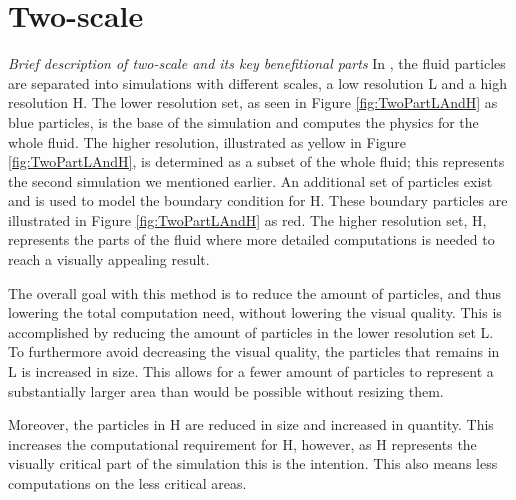 \documentclass[../main.tex]{subfiles}
\begin{document}
\section{Two-scale}
\textit{Brief description of two-scale and its key benefitional parts}
In \cite{solenthaler2011two}, the fluid particles are separated into simulations with different scales, a low resolution L and a high resolution H. The lower resolution set, as seen in Figure \ref{fig:TwoPartLAndH} as blue particles, is the base of the simulation and computes the physics for the whole fluid. The higher resolution, illustrated as yellow in Figure \ref{fig:TwoPartLAndH}, is determined as a subset of the whole fluid; this represents the second simulation we mentioned earlier. An additional set of particles exist and is used to model the boundary condition for H. These boundary particles are illustrated in Figure \ref{fig:TwoPartLAndH} as red. The higher resolution set, H, represents the parts of the fluid where more detailed computations is needed to reach a visually appealing result.

The overall goal with this method is to reduce the amount of particles, and thus lowering the total computation need, without lowering the visual quality. This is accomplished by reducing the amount of particles in the lower resolution set L. To furthermore avoid decreasing the visual quality, the particles that remains in L is increased in size. This allows for a fewer amount of particles to represent a substantially larger area than would be possible without resizing them. 

Moreover, the particles in H are reduced in size and increased in quantity. This increases the computational requirement for H, however, as H represents the visually critical part of the simulation this is the intention. This also means less computations on the less critical areas.

\subsection{}

\end{document}
